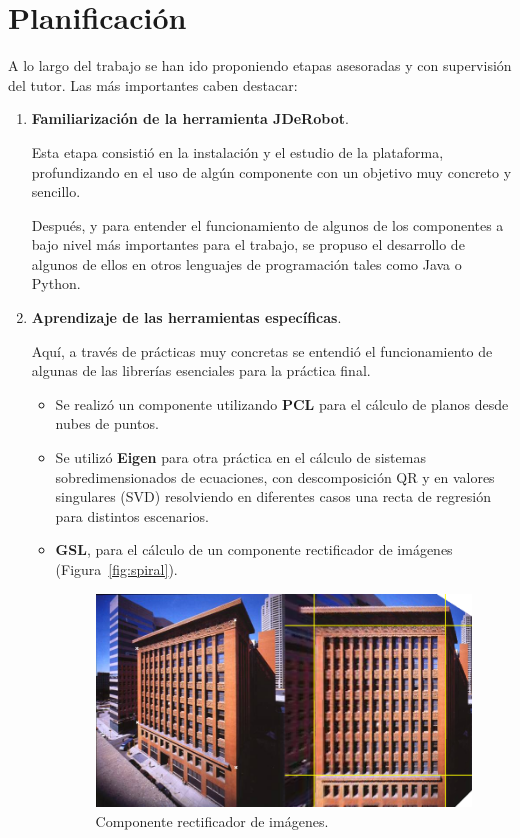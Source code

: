 \section{Planificación}

A lo largo del trabajo se han ido proponiendo etapas asesoradas y con supervisión del tutor. Las más importantes caben destacar:

\begin{enumerate}

\item \textbf{Familiarización de la herramienta JDeRobot}.

Esta etapa consistió en la instalación y el estudio de la plataforma, profundizando en el uso de algún componente con un objetivo muy concreto y sencillo.

Después, y para entender el funcionamiento de algunos de los componentes a bajo nivel más importantes para el trabajo, se propuso el desarrollo de algunos de ellos en otros lenguajes de programación tales como Java o Python.

\item \textbf{Aprendizaje de las herramientas específicas}.

Aquí, a través de prácticas muy concretas se entendió el funcionamiento de algunas de las librerías esenciales para la práctica final.

\begin{itemize}

\item Se realizó un componente utilizando \textbf{PCL} para el cálculo de planos desde nubes de puntos.

\item Se utilizó \textbf{Eigen} para otra práctica en el cálculo de sistemas sobredimensionados de ecuaciones, con descomposición QR y en valores singulares (SVD) resolviendo en diferentes casos una recta de regresión para distintos escenarios.

\item \textbf{GSL}, para el cálculo de un componente rectificador de imágenes (Figura~\ref{fig:spiral}).

\begin{figure}[th]
\centering
\includegraphics[scale=0.5]{Figures/rectifier.png}
\decoRule
\caption[Rectifier]{Componente rectificador de imágenes.}
\label{fig:rectifier}
\end{figure}



\end{itemize}
\end{enumerate}
